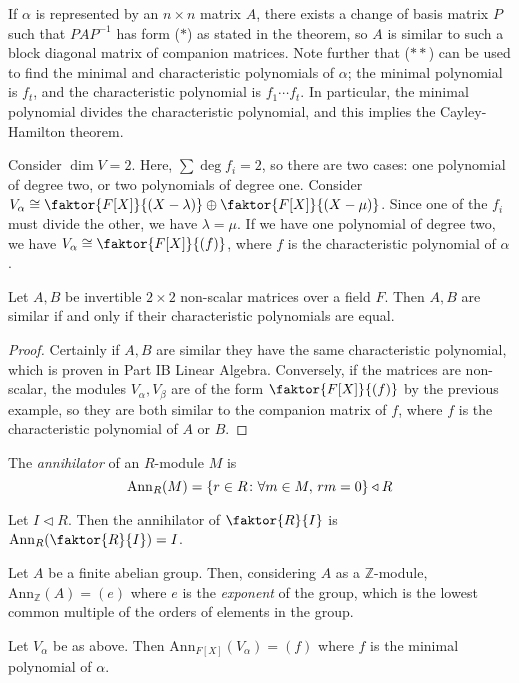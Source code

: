\begin{remark}
	If \( \alpha \) is represented by an \( n \times n \) matrix \( A \), there exists a change of basis matrix \( P \) such that \( PAP^{-1} \) has form (\(\ast\)) as stated in the theorem, so \( A \) is similar to such a block diagonal matrix of companion matrices.
	Note further that (\(\ast\ast\)) can be used to find the minimal and characteristic polynomials of \( \alpha \); the minimal polynomial is \( f_t \), and the characteristic polynomial is \( f_1 \cdots f_t \).
	In particular, the minimal polynomial divides the characteristic polynomial, and this implies the Cayley-Hamilton theorem.
\end{remark}
\begin{example}
	Consider \( \dim V = 2 \).
	Here, \( \sum \deg f_i = 2 \), so there are two cases: one polynomial of degree two, or two polynomials of degree one.
	Consider \( V_\alpha \cong \faktor{F[X]}{(X-\lambda)} \oplus \faktor{F[X]}{(X-\mu)} \).
	Since one of the \( f_i \) must divide the other, we have \( \lambda = \mu \).
	If we have one polynomial of degree two, we have \( V_\alpha \cong \faktor{F[X]}{(f)} \), where \( f \) is the characteristic polynomial of \( \alpha \).
\end{example}
\begin{corollary}
	Let \( A, B \) be invertible \( 2 \times 2 \) non-scalar matrices over a field \( F \).
	Then \( A, B \) are similar if and only if their characteristic polynomials are equal.
\end{corollary}
\begin{proof}
	Certainly if \( A, B \) are similar they have the same characteristic polynomial, which is proven in Part IB Linear Algebra.
	Conversely, if the matrices are non-scalar, the modules \( V_\alpha, V_\beta \) are of the form \( \faktor{F[X]}{(f)} \) by the previous example, so they are both similar to the companion matrix of \( f \), where \( f \) is the characteristic polynomial of \( A \) or \( B \).
\end{proof}
\begin{definition}
	The \textit{annihilator} of an \( R \)-module \( M \) is
	\[ \mathrm{Ann}_R(M) = \qty{r \in R \colon \forall m \in M,\, rm = 0} \triangleleft R \]
\end{definition}
\begin{example}
	Let \( I \triangleleft R \).
	Then the annihilator of \( \faktor{R}{I} \) is \( \mathrm{Ann}_R\qty(\faktor{R}{I}) = I \).

	Let \( A \) be a finite abelian group.
	Then, considering \( A \) as a \( \mathbb Z \)-module, \( \mathrm{Ann}_{\mathbb Z}(A) = (e) \) where \( e \) is the \textit{exponent} of the group, which is the lowest common multiple of the orders of elements in the group.

	Let \( V_\alpha \) be as above.
	Then \( \mathrm{Ann}_{F[X]}(V_\alpha) = (f) \) where \( f \) is the minimal polynomial of \( \alpha \).
\end{example}


